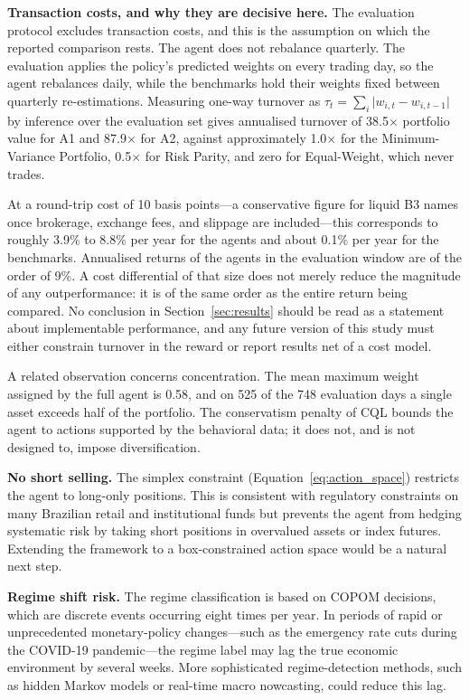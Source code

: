 \textbf{Transaction costs, and why they are decisive here.}
The evaluation protocol excludes transaction costs, and this is the assumption
on which the reported comparison rests.
The agent does not rebalance quarterly.
The evaluation applies the policy's predicted weights on every trading day, so
the agent rebalances daily, while the benchmarks hold their weights fixed
between quarterly re-estimations.
Measuring one-way turnover as
$\tau_t = \sum_i \lvert w_{i,t} - w_{i,t-1} \rvert$ by inference over the
evaluation set gives annualised turnover of 38.5$\times$ portfolio value for
A1 and 87.9$\times$ for A2, against approximately 1.0$\times$ for the
Minimum-Variance Portfolio, 0.5$\times$ for Risk Parity, and zero for
Equal-Weight, which never trades.

At a round-trip cost of 10 basis points---a conservative figure for liquid B3
names once brokerage, exchange fees, and slippage are included---this
corresponds to roughly 3.9\% to 8.8\% per year for the agents and about
0.1\% per year for the benchmarks.
Annualised returns of the agents in the evaluation window are of the order of
9\%.
A cost differential of that size does not merely reduce the magnitude of any
outperformance: it is of the same order as the entire return being compared.
No conclusion in Section~\ref{sec:results} should be read as a statement about
implementable performance, and any future version of this study must either
constrain turnover in the reward or report results net of a cost model.

A related observation concerns concentration.
The mean maximum weight assigned by the full agent is 0.58, and on 525 of the
748 evaluation days a single asset exceeds half of the portfolio.
The conservatism penalty of CQL bounds the agent to actions supported by the
behavioral data; it does not, and is not designed to, impose diversification.

\textbf{No short selling.}
The simplex constraint (Equation~\eqref{eq:action_space}) restricts the agent to
long-only positions.
This is consistent with regulatory constraints on many Brazilian retail and
institutional funds but prevents the agent from hedging systematic risk by taking
short positions in overvalued assets or index futures.
Extending the framework to a box-constrained action space would be a natural
next step.

\textbf{Regime shift risk.}
The regime classification is based on COPOM decisions, which are discrete events
occurring eight times per year.
In periods of rapid or unprecedented monetary-policy changes---such as the
emergency rate cuts during the COVID-19 pandemic---the regime label may lag
the true economic environment by several weeks.
More sophisticated regime-detection methods, such as hidden Markov models or
real-time macro nowcasting, could reduce this lag.

